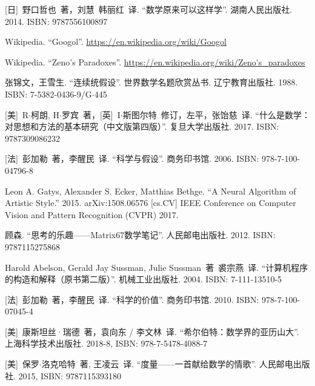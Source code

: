 \documentclass[UTF8]{article}
\begin{document}
\begin{thebibliography}{99}
[日]\ 野口哲也\ 著，刘慧\ 韩丽红\ 译. ``数学原来可以这样学''. 湖南人民出版社. 2014. ISBN: 9787556100897

Wikipedia. ``Googol''. \url{https://en.wikipedia.org/wiki/Googol}

Wikipedia. ``Zeno's Paradoxes''. \url{https://en.wikipedia.org/wiki/Zeno's_paradoxes}

张锦文，王雪生. ``连续统假设''. 世界数学名题欣赏丛书. 辽宁教育出版社. 1988. ISBN: 7-5382-0436-9/G$\cdot$445

[美]\ R$\cdot$柯朗, H$\cdot$罗宾\ 著，[英]\ I$\cdot$斯图尔特\ 修订，左平，张饴慈\ 译. ``什么是数学：对思想和方法的基本研究（中文版第四版）''. 复旦大学出版社. 2017. ISBN: 9787309086232


[法]\ 彭加勒\ 著，李醒民\ 译. ``科学与假设''. 商务印书馆. 2006. ISBN: 978-7-100-04796-8

Leon A. Gatys, Alexander S. Ecker, Matthias Bethge. ``A Neural Algorithm of Artistic Style.'' 2015. arXiv:1508.06576 [cs.CV] IEEE Conference on Computer Vision and Pattern Recognition (CVPR) 2017.

顾森. ``思考的乐趣——Matrix67数学笔记''. 人民邮电出版社. 2012. ISBN: 9787115275868

Harold Abelson, Gerald Jay Sussman, Julie Sussman\ 著\ 裘宗燕\ 译. ``计算机程序的构造和解释（原书第二版）''. 机械工业出版社. 2004. ISBN: 7-111-13510-5

[法]\ 彭加勒\ 著，李醒民\ 译. ``科学的价值''. 商务印书馆. 2010. ISBN: 978-7-100-07045-4

[美]\ 康斯坦丝·瑞德\ 著，袁向东 / 李文林\ 译. ``希尔伯特：数学界的亚历山大''. 上海科学技术出版社. 2018-8, ISBN: 978-7-5478-4088-7


[美]\ 保罗$\cdot$洛克哈特\ 著, 王凌云\ 译. ``度量——一首献给数学的情歌''. 人民邮电出版社. 2015, ISBN: 9787115393180

\end{thebibliography}

\ifx\wholebook\relax \else

\expandafter\enddocument

\fi
\end{document}
